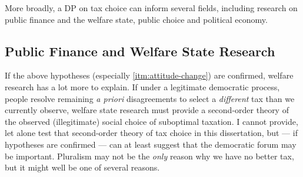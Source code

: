 




More broadly, a \gls{DP} on tax choice can inform several fields, including research on public finance and the welfare state, public choice and political economy.

\subsection{Public Finance and Welfare State Research}
If the above hypotheses (especially \ref{itm:attitude-change}) are confirmed, welfare research has a lot more to explain.
If under a legitimate democratic process, people resolve remaining \emph{a priori} disagreements to select a \emph{different} tax than we currently observe, welfare state research must provide a second-order theory of the observed (illegitimate) social choice of suboptimal taxation.
I cannot provide, let alone test that second-order theory of tax choice in this dissertation, but --- if hypotheses are confirmed --- can at least suggest that the democratic forum may be important.
Pluralism may not be the \emph{only} reason why we have no better tax, but it might well be one of several reasons.

